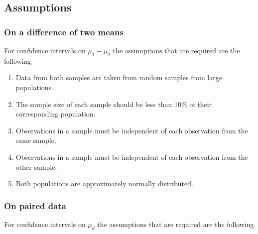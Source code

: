 %








\subsection{Assumptions}

\subsubsection{On a difference of two means}

For confidence intervals on $\mu_{1} - \mu_{2}$ the assumptions that are required are the following

\begin{enumerate}
\item	Data from both samples are taken from random samples from large populations.
\item	The sample size of each sample should be less than 10\% of their corresponding population.
\item	Observations in a sample must be independent of each observation from the same sample.
\item	Observations in a sample must be independent of each observation from the other sample.
\item	Both populations are approximately normally distributed.
\end{enumerate}




\subsubsection{On paired data}

For confidence intervals on $\mu_{d}$ the assumptions that are required are the following

